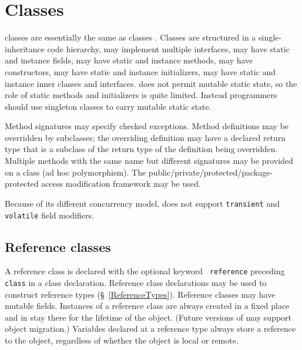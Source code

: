 \chapter{Classes}
\label{XtenClasses}

{}\Xten{} classes are essentially the same as \java{} classes \cite[\S
8]{jls2}. Classes are structured in a single-inheritance code
hierarchy, may implement multiple interfaces, may have static and
instance fields, may have static and instance methods, may have
constructors, may have static and instance initializers, may have
static and instance inner classes and interfaces. \Xten{} does not
permit mutable static state, so the role of static methods and
initializers is quite limited. Instead programmers should use
singleton classes to carry mutable static state.

Method signatures may specify checked exceptions. Method definitions
may be overridden by subclasses; the overriding definition may have a
declared return type that is a subclass of the return type of the
definition being overridden. Multiple methods with the same name but
different signatures may be provided on a class (ad hoc
polymorphism). The public/private/protected/package-protected access
modification framework may be used.


Because of its different concurrency model, \Xten{} does not support
{\tt transient} and {\tt volatile} field modifiers.


\section{Reference classes}\label{ReferenceClasses}
A reference class is declared with the optional keyword {\tt
reference} preceding {\tt class} in a class declaration. Reference
class declarations may be used to construct reference types
(\S~\ref{ReferenceTypes}). Reference classes may have mutable
fields. Instances of a reference class are always created in a fixed
place and in \XtenCurrVer{} stay there for the lifetime of the
object. (Future versions of \Xten{} may support object migration.)
Variables declared at a reference type always store a reference to the
object, regardless of whether the object is local or remote.

